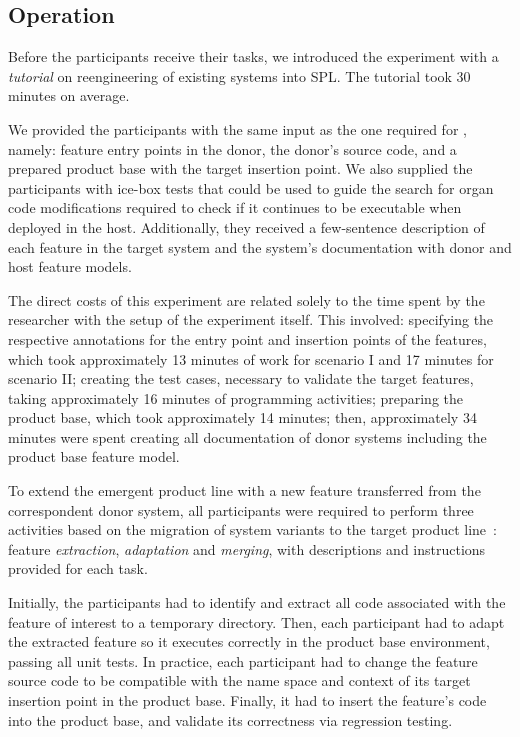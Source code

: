 \subsection{Operation} 

Before the participants receive their tasks, we introduced the experiment with a \emph{tutorial} on reengineering of existing systems into SPL. The tutorial took 30 minutes on average.

We provided the participants with the same input as the one required for \FOUNDRY, namely: feature entry points in the donor, the donor’s source code, and a prepared product base with the target insertion point.
We also supplied the participants with ice-box tests that could be used to guide the search for organ code modifications required to check if it continues to be executable when deployed in the host. Additionally, they received a few-sentence description of each feature in the target system and the system’s documentation with donor and host feature models. 

The direct costs of this experiment are related solely to the time spent by the researcher with the setup of the experiment itself. 
This involved: specifying the respective annotations for the entry point and insertion points of the features, which took approximately 13 minutes of work for scenario I and 17 minutes for scenario II; creating the test cases, necessary to validate the target features, taking approximately 16 minutes of programming activities; preparing the product base, which took approximately 14 minutes; then, approximately 34 minutes were spent creating all documentation of donor systems including the product base feature model.

To extend the emergent product line with a new feature transferred from the correspondent donor system, all participants were required to perform three activities based on the migration of system variants to the target product line~\cite{Krueger2001,Mahmood2021}: feature \emph{extraction}, \emph{adaptation} and \emph{merging}, with descriptions and instructions provided for each task.  

Initially, the participants had to identify and extract all code associated with the feature of interest to a temporary directory. 
Then, each participant had to adapt the extracted feature so it executes correctly in the product base environment, passing all unit tests. In practice, each participant had to change the feature source code to be compatible with the name space and context of its target insertion point in the product base. Finally, it had to insert the feature's code into the product base, and validate its correctness via regression testing.


